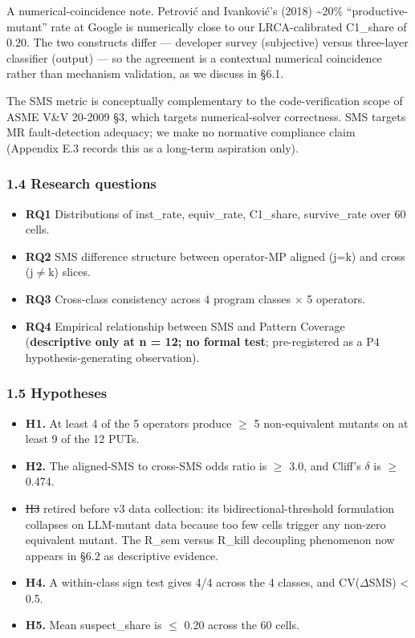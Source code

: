 \documentclass[review,12pt,authoryear]{elsarticle}
\providecommand{\tightlist}{\setlength{\itemsep}{0pt}\setlength{\parskip}{0pt}}
\providecommand{\st}[1]{\sout{#1}} %
\begin{document}
A numerical-coincidence note. Petrović and Ivanković's (2018)
\textasciitilde20\% ``productive-mutant'' rate at Google is numerically
close to our LRCA-calibrated C1\_share of 0.20. The two constructs
differ --- developer survey (subjective) versus three-layer classifier
(output) --- so the agreement is a contextual numerical coincidence
rather than mechanism validation, as we discuss in §6.1.

The SMS metric is conceptually complementary to the code-verification
scope of ASME V\&V 20-2009 §3, which targets numerical-solver
correctness. SMS targets MR fault-detection adequacy; we make no
normative compliance claim (Appendix E.3 records this as a long-term
aspiration only).

\subsubsection{1.4 Research questions}\label{research-questions}

\begin{itemize}
\tightlist
\item
  \textbf{RQ1} Distributions of inst\_rate, equiv\_rate, C1\_share,
  survive\_rate over 60 cells.
\item
  \textbf{RQ2} SMS difference structure between operator-MP aligned
  (j=k) and cross (j$\neq$k) slices.
\item
  \textbf{RQ3} Cross-class consistency across 4 program classes $\times$ 5
  operators.
\item
  \textbf{RQ4} Empirical relationship between SMS and Pattern Coverage
  (\textbf{descriptive only at n = 12; no formal test}; pre-registered
  as a P4 hypothesis-generating observation).
\end{itemize}

\subsubsection{1.5 Hypotheses}\label{hypotheses}

\begin{itemize}
\tightlist
\item
  \textbf{H1.} At least 4 of the 5 operators produce $\geq$ 5 non-equivalent
  mutants on at least 9 of the 12 PUTs.
\item
  \textbf{H2.} The aligned-SMS to cross-SMS odds ratio is $\geq$ 3.0, and
  Cliff's $\delta$ is $\geq$ 0.474.
\item
  \st{H3} retired before v3 data collection: its bidirectional-threshold
  formulation collapses on LLM-mutant data because too few cells trigger
  any non-zero equivalent mutant. The R\_sem versus R\_kill decoupling
  phenomenon now appears in §6.2 as descriptive evidence.
\item
  \textbf{H4.} A within-class sign test gives 4/4 across the 4 classes,
  and CV($\Delta$SMS) \textless{} 0.5.
\item
  \textbf{H5.} Mean suspect\_share is $\leq$ 0.20 across the 60 cells.
\end{itemize}
\end{document}
